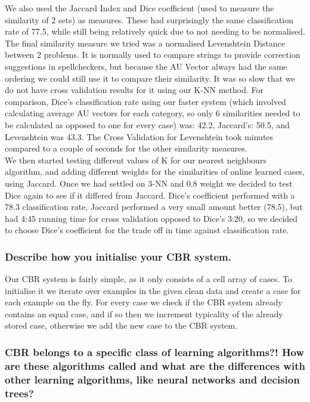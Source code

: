 \documentclass[12pt]{article}
\begin{document}
We also used the Jaccard Index and Dice coefficient (used to measure the similarity of 2 sets) as measures. These had surprisingly the same classification rate of 77.5, while still being relatively quick due to not needing to be normalised. \\

The final similarity measure we tried was a normalised Levenshtein Distance between 2 problems. It is normally used to compare strings to provide correction suggestions in spellcheckers, but because the AU Vector always had the same ordering we could still use it to compare their similarity. It was so slow that we do not have cross validation results for it using our K-NN method. For comparison, Dice's classification rate using our faster system (which involved calculating average AU vectors for each category, so only 6 similarities needed to be calculated as opposed to one for every case) was: 42.2, Jaccard's: 50.5, and Levenshtein was 43.3. The Cross Validation for Levenshtein took minutes compared to a couple of seconds for the other similarity measures.  \\

We then started testing different values of K for our nearest neighbours algorithm, and adding different weights for the similarities of online learned cases, using Jaccard. Once we had settled on 3-NN and 0.8 weight we decided to test Dice again to see if it differed from Jaccard. Dice's coefficient performed with a 78.3 classification rate, Jaccard performed a very small amount better (78.5), but had 4:45 running time for cross validation opposed to Dice's 3:20, so we decided to choose Dice's coefficient for the trade off in time against classification rate.

\subsubsection*{Describe how you initialise your CBR system.}

Our CBR system is fairly simple, as it only consists of a cell array of cases. To initialise it we iterate over examples in the given clean data and create a case for each example on the fly. For every case we check if the CBR system already contains an equal case, and if so then we increment typicality of the already stored case, otherwise we add the new case to the CBR system.

\subsubsection*{CBR belongs to a specific class of learning algorithms?! How are these algorithms called and what are the differences with other learning algorithms, like neural networks and decision trees?}
\end{document}
